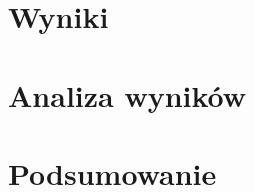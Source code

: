 \documentclass{article}
\begin{document}
\section{Wyniki}

\section{Analiza wyników}

\section{Podsumowanie}

\newpage

\end{document}
